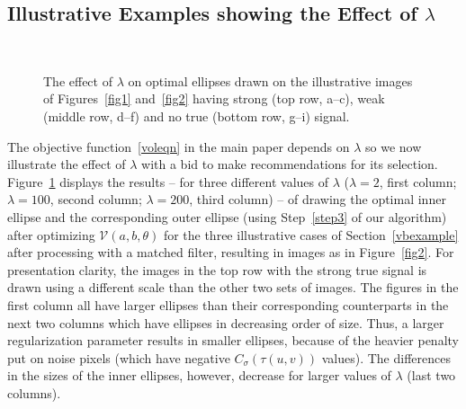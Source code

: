 \documentclass[12pt]{article}
\newcommand{\mV}{\mathcal V}
\begin{document}
\subsection{Illustrative Examples showing the Effect of $\lambda$}
\label{S-lambda}
\begin{figure}[!h]
\vspace{-0in}
\begin{center}
\mbox{
}
\mbox{
}
\mbox{
}
\end{center}
\vspace{-0.2in}
\caption{The effect of $\lambda$ on optimal ellipses drawn on the 
  illustrative images of Figures~\ref{fig1} and~\ref{fig2} having
  strong (top row, a--c), weak (middle row, d--f) and no true (bottom row,
  g--i) signal.} 
\label{lambdaeffect}
\vspace{-0.1in}
\end{figure}
The objective function~\eqref{voleqn} in the main paper depends on
$\lambda$ so we now illustrate the effect of $\lambda$ with a bid to
make recommendations for its selection. 
Figure~\ref{lambdaeffect}  displays  the results -- for three different
values of $\lambda$ ($\lambda = 2$, first column; $\lambda = 100$,
second column; $\lambda = 200$, third column) -- of drawing the optimal
inner ellipse and the 
corresponding outer ellipse (using Step~\ref{step3} of our algorithm)
after optimizing $\mV(a,b,\theta)$ for the three illustrative cases of 
Section~\ref{vbexample} after processing with a matched filter,
resulting in images as in Figure~\ref{fig2}.  For presentation
clarity, the images in the top row with the strong true signal is drawn
using a different scale than the other two sets of images. 
The figures in the first column all have larger ellipses than their 
corresponding counterparts in the next two columns which have ellipses
in decreasing order of size. Thus, a larger regularization parameter results  
in smaller ellipses, because of the heavier penalty put on noise
pixels (which have negative $C_\sigma(\tau(u,v))$ values). The
differences in the sizes of the inner ellipses, however, decrease 
for larger values of $\lambda$ (last two columns). 
\end{document}
